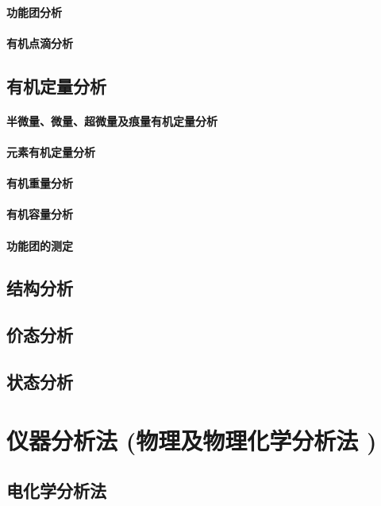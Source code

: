 \documentclass[UTF8]{../03-Chemistry}
\begin{document}
    \subsubsection{功能团分析}
    \subsubsection{有机点滴分析}
\section{有机定量分析}
    \subsubsection{半微量、微量、超微量及痕量有机定量分析}
    \subsubsection{元素有机定量分析}
    \subsubsection{有机重量分析}
    \subsubsection{有机容量分析}
    \subsubsection{功能团的测定}
\section{结构分析}
\section{价态分析}
\section{状态分析}








\chapter{仪器分析法 (物理及物理化学分析法 )}
\section{电化学分析法}
\end{document}
